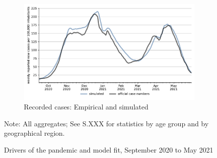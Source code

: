 \begin{figure}[!tp]
\begin{subfigure}[b]{0.475\textwidth}
        \includegraphics[width=\textwidth]{../figures/results/figures/scenario_comparisons/combined_fit/full_new_known_case}
        \caption{{\small Recorded cases: Empirical and simulated}}
        \label{fig:aggregated_fit}
    \end{subfigure}

    \caption{Drivers of the pandemic and model fit, September 2020 to May 2021}
    \label{fig:pandemic_drivers_model_fit}

    Note: All aggregates; See S.XXX for statistics by age group and by geographical region.

\end{figure}



